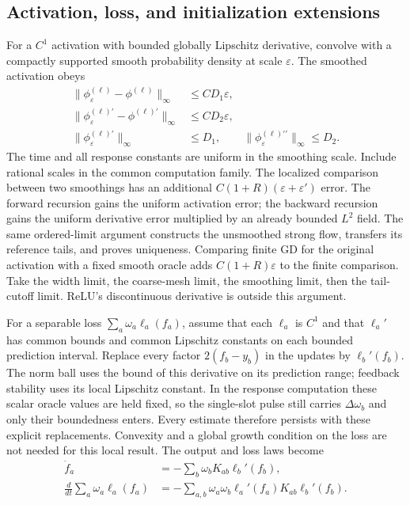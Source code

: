 \subsection{Activation, loss, and initialization extensions}
\label{app:extensions}

For a $C^1$ activation with bounded globally Lipschitz derivative,
convolve with a compactly supported smooth probability density at scale
$\varepsilon$.  The smoothed activation obeys
\begin{align*}
 \|\phi_\varepsilon^{(\ell)}-\phi^{(\ell)}\|_\infty
 &\le CD_1\varepsilon,\\
 \|\phi_\varepsilon^{(\ell)\prime}
             -\phi^{(\ell)\prime}\|_\infty
 &\le CD_2\varepsilon,\\
 \|\phi_\varepsilon^{(\ell)\prime}\|_\infty&\le D_1,
 \qquad
 \|\phi_\varepsilon^{(\ell)\prime\prime}\|_\infty\le D_2.
\end{align*}
The time and all response constants are uniform in the smoothing
scale.  Include rational scales in the common computation family.
The localized comparison between two smoothings has an additional
$C(1+R)(\varepsilon+\varepsilon')$ error.  The forward recursion gains
the uniform activation error; the backward recursion gains the uniform
derivative error multiplied by an already bounded $L^2$ field.  The
same ordered-limit argument constructs the unsmoothed strong flow,
transfers its reference tails, and proves uniqueness.  Comparing
finite GD for the original activation with a fixed smooth oracle adds
$C(1+R)\varepsilon$ to the finite comparison.  Take the width limit,
the coarse-mesh limit, the smoothing limit, then the tail-cutoff limit.
ReLU's discontinuous derivative is outside this argument.

For a separable loss $\sum_a\omega_a\ell_a(f_a)$, assume that each
$\ell_a$ is $C^1$ and that $\ell_a'$ has common bounds and common
Lipschitz constants on each bounded prediction interval.  Replace
every factor $2(f_b-y_b)$ in the updates by $\ell_b'(f_b)$.
The norm ball uses the bound of this derivative on its prediction
range; feedback stability uses its local Lipschitz constant.  In the
response computation these scalar oracle values are held fixed, so
the single-slot pulse still carries $\Delta\omega_b$ and only their
boundedness enters.  Every estimate therefore persists with these
explicit replacements.  Convexity and a global growth condition on the
loss are not needed for this local result.  The output and loss laws
become
\begin{align*}
 \dot f_a&=-\sum_b\omega_bK_{ab}\ell_b'(f_b),\\
 \frac{d}{dt}\sum_a\omega_a\ell_a(f_a)
 &=-\sum_{a,b}\omega_a\omega_b
        \ell_a'(f_a)K_{ab}\ell_b'(f_b).
\end{align*}

